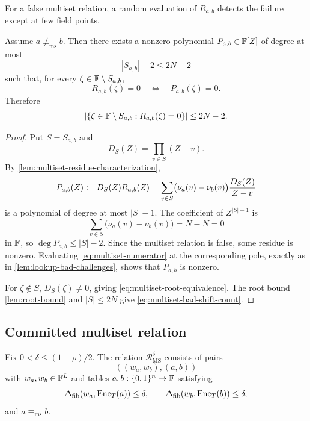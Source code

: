 For a false multiset relation, a random evaluation of $R_{a,b}$ detects the failure except at few field points.

\begin{lemma}
\label{lem:multiset-bad-shifts}
Assume $a\not\equiv_{\mathrm{ms}}b$.  Then there exists a nonzero polynomial $P_{a,b}\in\mathbb{F}[Z]$ of degree at most
\begin{equation}
  |S_{a,b}|-2\le2N-2
  \label{eq:multiset-numerator-degree}
\end{equation}
such that, for every $\zeta\in\mathbb{F}\setminus S_{a,b}$,
\begin{equation}
  R_{a,b}(\zeta)=0
  \quad\Longleftrightarrow\quad
  P_{a,b}(\zeta)=0.
  \label{eq:multiset-root-equivalence}
\end{equation}
Therefore
\begin{equation}
  \left|
    \{\zeta\in\mathbb{F}\setminus S_{a,b}:R_{a,b}(\zeta)=0\}
  \right|
  \le2N-2.
  \label{eq:multiset-bad-shift-count}
\end{equation}
\end{lemma}

\begin{proof}
Put $S=S_{a,b}$ and
\[
  D_S(Z)=\prod_{v\in S}(Z-v).
\]
By \cref{lem:multiset-residue-characterization},
\begin{equation}
  P_{a,b}(Z)
  \coloneqq D_S(Z)R_{a,b}(Z)
  =
  \sum_{v\in S}
  \bigl(\nu_a(v)-\nu_b(v)\bigr)
  \frac{D_S(Z)}{Z-v}
  \label{eq:multiset-numerator}
\end{equation}
is a polynomial of degree at most $|S|-1$.  The coefficient of $Z^{|S|-1}$ is
\[
  \sum_{v\in S}\bigl(\nu_a(v)-\nu_b(v)\bigr)
  =N-N=0
\]
in $\mathbb{F}$, so $\deg P_{a,b}\le |S|-2$.  Since the multiset relation is false, some residue is nonzero.  Evaluating \eqref{eq:multiset-numerator} at the corresponding pole, exactly as in \cref{lem:lookup-bad-challenges}, shows that $P_{a,b}$ is nonzero.

For $\zeta\notin S$, $D_S(\zeta)\ne0$, giving \eqref{eq:multiset-root-equivalence}.  The root bound \cref{lem:root-bound} and $|S|\le2N$ give \eqref{eq:multiset-bad-shift-count}.
\end{proof}

\subsection{Committed multiset relation}
\label{sec:committed-multiset}

\begin{definition}
\label{def:committed-multiset-relation}
Fix $0<\delta\le(1-\rho)/2$.  The relation $\mathcal R^{\delta}_{\mathrm{MS}}$ consists of pairs
\[
  ((w_a,w_b),(a,b))
\]
with $w_a,w_b\in\mathbb{F}^L$ and tables $a,b:\{0,1\}^n\to\mathbb{F}$ satisfying
\begin{equation}
  \Delta_{\mathrm{fib}}(w_a,\operatorname{Enc}_T(a))\le\delta,
  \qquad
  \Delta_{\mathrm{fib}}(w_b,\operatorname{Enc}_T(b))\le\delta,
  \label{eq:multiset-commitment-distances}
\end{equation}
and $a\equiv_{\mathrm{ms}}b$.
\end{definition}

